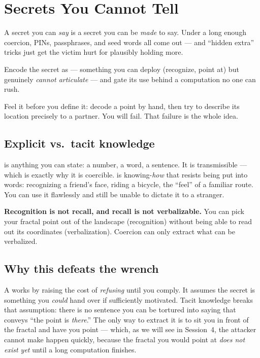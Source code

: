\documentclass[a4paper,11pt]{report}
\newcommand{\probsoln}[3]{%
  \begin{description}[leftmargin=0pt,labelsep=0.5em,style=nextline]
    \item[\textcolor{attackcol}{Problem.}] #1
    \item[\textcolor{accent}{Solution.}] #2
    \item[\textcolor{modelcol}{Methodology.}] #3
  \end{description}}
\begin{document}
\chapter{Secrets You Cannot Tell}

\probsoln
{A secret you can \emph{say} is a secret you can be \emph{made} to say. Under a
long enough coercion, PINs, passphrases, and seed words all come out — and
``hidden extra'' tricks just get the victim hurt for plausibly holding more.}
{Encode the secret as \term{tacit knowledge} — something you can deploy
(recognize, point at) but genuinely \emph{cannot articulate} — and gate its use
behind a computation no one can rush.}
{Feel it before you define it: decode a point by hand, then try to describe its
location precisely to a partner. You will fail. That failure is the whole idea.}

\section{Explicit vs.\ tacit knowledge}
 is anything you can state: a number, a word, a
sentence. It is transmissible — which is exactly why it is coercible.  is knowing-\emph{how} that resists being put into words: recognizing a
friend's face, riding a bicycle, the ``feel'' of a familiar route. You can use it
flawlessly and still be unable to dictate it to a stranger.

\begin{keyidea}
\textbf{Recognition is not recall, and recall is not verbalizable.} You can pick
your fractal point out of the landscape (recognition) without being able to read
out its coordinates (verbalization). Coercion can only extract what can be
verbalized.
\end{keyidea}

\section{Why this defeats the wrench}
A \wrench{} works by raising the cost of \emph{refusing} until you comply.
It assumes the secret is something you \emph{could} hand over if sufficiently
motivated. Tacit knowledge breaks that assumption: there is no sentence you can
be tortured into saying that conveys ``the point is \emph{there}.'' The only way
to extract it is to sit you in front of the fractal and have you point — which,
as we will see in Session~4, the attacker cannot make happen quickly, because the
fractal you would point at \emph{does not exist yet} until a long computation
finishes.
\end{document}

